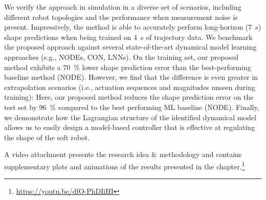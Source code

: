 We verify the approach in simulation in a diverse set of scenarios, including different robot topologies and the performance when measurement noise is present. Impressively, the method is able to accurately perform long-horizon (\SI{7}{s}) shape predictions when being trained on \SI{4}{s} of trajectory data.
We benchmark the proposed approach against several state-of-the-art dynamical model learning approaches (e.g., \glspl{NODE}, \gls{CON}, \glspl{LNN}). On the training set, our proposed method exhibits a \SI{70}{\percent} lower shape prediction error than the best-performing baseline method (\gls{NODE}).
However, we find that the difference is even greater in extrapolation scenarios (i.e., actuation sequences and magnitudes unseen during training): Here, our proposed method reduces the shape prediction error on the test set by \SI{96}{\percent} compared to the best performing \gls{ML} baseline (\gls{NODE}).
Finally, we demonstrate how the Lagrangian structure of the identified dynamical model allows us to easily design a model-based controller that is effective at regulating the shape of the soft robot.

A video attachment presents the research idea \& methodology and contains supplementary plots and animations of the results presented in the chapter.\footnote{{\small \url{https://youtu.be/dfO-PhDIiHI}}}